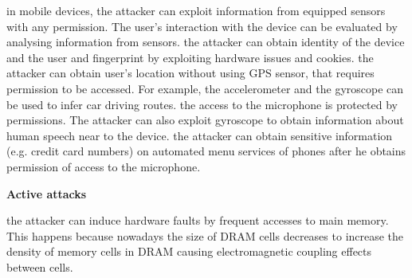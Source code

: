 \begin{itemize}
{in mobile devices, the attacker can exploit information from equipped sensors with any permission. The user's interaction with the device can be evaluated by analysing information from sensors.}
{the attacker can obtain identity of the device and the user and fingerprint by exploiting hardware issues and cookies.}
{the attacker can obtain user's location without using GPS sensor, that requires permission to be accessed. For example, the accelerometer and the gyroscope can be used to infer car driving routes.}
{the access to the microphone is protected by permissions. The attacker can also exploit gyroscope to obtain information about human speech near to the device.}
{the attacker can obtain sensitive information (e.g. credit card numbers) on automated menu services of phones after he obtains permission of access to the microphone.}
\end{itemize}
\textbf{Active attacks}
\begin{itemize}
{the attacker can induce hardware faults by frequent accesses to main memory. This happens because nowadays the size of DRAM cells decreases to increase the density of memory cells in DRAM causing electromagnetic coupling effects between cells.}
\end{itemize}
